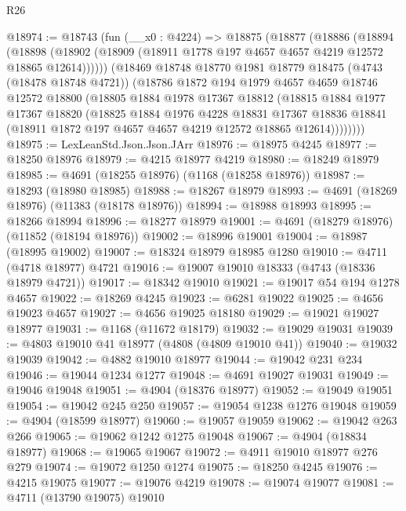 \begin{lexlean}{R26}
\begin{coremodule}
@18974 := @18743
    (fun (__x0 : @4224) =>
    @18875
      (@18877
        (@18886
          (@18894
            (@18898 (@18902 (@18909 (@18911 @1778 @197 @4657 @4657 @4219 @12572 @18865 @12614))))))
        (@18469
          @18748
          @18770
          @1981
          @18779
          @18475
          (@4743 (@18478 @18748 @4721))
          (@18786
            @1872
            @194
            @1979
            @4657
            @4659
            @18746
            @12572
            @18800
            (@18805
              @1884
              @1978
              @17367
              @18812
              (@18815
                @1884
                @1977
                @17367
                @18820
                (@18825
                  @1884
                  @1976
                  @4228
                  @18831
                  @17367
                  @18836
                  @18841
                  (@18911 @1872 @197 @4657 @4657 @4219 @12572 @18865 @12614))))))))
@18975 := LexLeanStd.Json.Json.JArr
@18976 := @18975 @4245
@18977 := @18250 @18976
@18979 := @4215 @18977 @4219
@18980 := @18249 @18979
@18985 := @4691 (@18255 @18976) (@1168 (@18258 @18976))
@18987 := @18293 (@18980 @18985)
@18988 := @18267 @18979
@18993 := @4691 (@18269 @18976) (@11383 (@18178 @18976))
@18994 := @18988 @18993
@18995 := @18266 @18994
@18996 := @18277 @18979
@19001 := @4691 (@18279 @18976) (@11852 (@18194 @18976))
@19002 := @18996 @19001
@19004 := @18987 (@18995 @19002)
@19007 := @18324 @18979 @18985 @1280
@19010 := @4711 (@4718 @18977) @4721
@19016 := @19007 @19010 @18333 (@4743 (@18336 @18979 @4721))
@19017 := @18342 @19010
@19021 := @19017 @54 @194 @1278 @4657
@19022 := @18269 @4245
@19023 := @6281 @19022
@19025 := @4656 @19023 @4657
@19027 := @4656 @19025 @18180
@19029 := @19021 @19027 @18977
@19031 := @1168 (@11672 @18179)
@19032 := @19029 @19031
@19039 := @4803 @19010 @41 @18977 (@4808 (@4809 @19010 @41))
@19040 := @19032 @19039
@19042 := @4882 @19010 @18977
@19044 := @19042 @231 @234
@19046 := @19044 @1234 @1277
@19048 := @4691 @19027 @19031
@19049 := @19046 @19048
@19051 := @4904 (@18376 @18977)
@19052 := @19049 @19051
@19054 := @19042 @245 @250
@19057 := @19054 @1238 @1276 @19048
@19059 := @4904 (@18599 @18977)
@19060 := @19057 @19059
@19062 := @19042 @263 @266
@19065 := @19062 @1242 @1275 @19048
@19067 := @4904 (@18834 @18977)
@19068 := @19065 @19067
@19072 := @4911 @19010 @18977 @276 @279
@19074 := @19072 @1250 @1274
@19075 := @18250 @4245
@19076 := @4215 @19075
@19077 := @19076 @4219
@19078 := @19074 @19077
@19081 := @4711 (@13790 @19075) @19010

\end{coremodule}
\end{lexlean}
